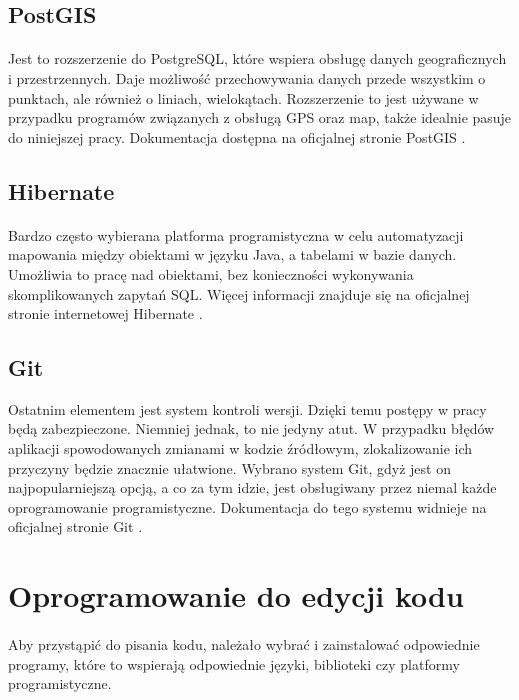 \subsection{PostGIS}
\paragraph{} 
Jest to rozszerzenie do PostgreSQL, które wspiera obsługę danych geograficznych i przestrzennych. Daje możliwość przechowywania danych przede wszystkim o punktach, ale również o liniach, wielokątach. Rozszerzenie to jest używane w przypadku programów związanych z obsługą GPS oraz map, także idealnie pasuje do niniejszej pracy. Dokumentacja dostępna na oficjalnej stronie PostGIS \cite{bib:postgis}.

\subsection{Hibernate}
\paragraph{}
Bardzo często wybierana platforma programistyczna w celu automatyzacji mapowania między obiektami w języku Java, a tabelami w bazie danych. Umożliwia to pracę nad obiektami, bez konieczności wykonywania skomplikowanych zapytań SQL. Więcej informacji znajduje się na oficjalnej stronie internetowej Hibernate \cite{bib:hibernate}.

\subsection{Git}
Ostatnim elementem jest system kontroli wersji. Dzięki temu postępy w pracy będą zabezpieczone. Niemniej jednak, to nie jedyny atut. W przypadku błędów aplikacji spowodowanych zmianami w kodzie źródłowym, zlokalizowanie ich przyczyny będzie znacznie ułatwione. Wybrano system Git, gdyż jest on najpopularniejszą opcją, a co za tym idzie, jest obsługiwany przez niemal każde oprogramowanie programistyczne. Dokumentacja do tego systemu widnieje na oficjalnej stronie Git \cite{bib:git}.

\section{Oprogramowanie do edycji kodu}
\paragraph{}
Aby przystąpić do pisania kodu, należało wybrać i zainstalować odpowiednie programy, które to wspierają odpowiednie języki, biblioteki czy platformy programistyczne.

